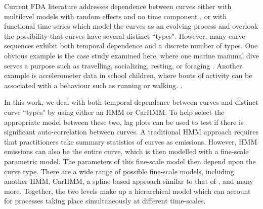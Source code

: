 

Current FDA literature addresses dependence between curves either with multilevel models with random effects and no time component \citep{Chen:2012,Di:2009}, or with functional time series which model the curves as an evolving process \citep{Kokoszka:2018} and overlook the possibility that curves have several distinct ``types". However, many curve sequences exhibit both temporal dependence and a discrete number of types. One obvious example is the case study examined here, where one marine mammal dive serves a purpose such as travelling, socializing, resting, or foraging \citep{Tennessen:2019a}. Another example is accelerometer data in school children, where bouts of activity can be associated with a behaviour such as running or walking. \citep{Morris:2007}.

In this work, we deal with both temporal dependence between curves and distinct curve ``types" by using either an HMM or CarHMM. To help select the appropriate model between these two, lag plots can be used to test if there is significant auto-correlation between curves. A traditional HMM approach requires that practitioners take summary statistics of curves as emissions. However, HMM emissions can also be the entire curve, which is then modelled with a fine-scale parametric model. The parameters of this fine-scale model then depend upon the curve type. There are a wide range of possible fine-scale models, including another HMM, CarHMM, a spline-based approach similar to that of \citet{Langrock:2018}, and many more. Together, the two levels make up a hierarchical model which can account for processes taking place simultaneously at different time-scales.



